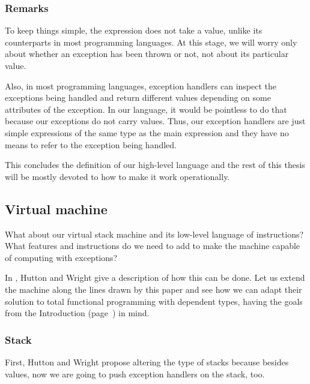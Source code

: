\subsubsection{Remarks}

To keep things simple, the  expression does not take a value,
unlike its counterparts in most programming languages. At this stage, we will
worry only about whether an exception has been thrown or not, not about its
particular value.

Also, in most programming languages, exception handlers can inspect the
exceptions being handled and return different values depending on some
attributes of the exception. In our language, it would be pointless to do that
because our exceptions do not carry values. Thus, our exception handlers are
just simple expressions of the same type as the main expression and they have
no means to refer to the exception being handled.

This concludes the definition of our high-level language and the rest of this thesis
will be mostly devoted to how to make it work operationally.

\subsection{Virtual machine}

What about our virtual stack machine and its low-level language of
instructions? What features and instructions do we need to add to make the
machine capable of computing with exceptions?

In \cite{gmh:exceptions}, Hutton and Wright give a description of how this can
be done. Let us extend the machine along the lines drawn by this paper and see
how we can adapt their solution to total functional programming with dependent
types, having the goals from the Introduction (page~\pageref{objectives}) in
mind.

\subsubsection{Stack}

First, Hutton and Wright propose altering the type of stacks because besides
values, now we are going to push exception handlers on the stack, too.

